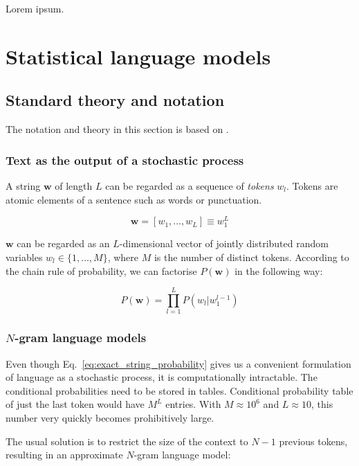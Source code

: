 \documentclass{IIBproject}
\begin{document}
Lorem ipsum.

\newpage
\section{Statistical language models}

\subsection{Standard theory and notation}

The notation and theory in this section is based on \cite{4f11:statistical_language_models, 4f11:smt_systems, coursera:nlp}.

\subsubsection{Text as the output of a stochastic process}

A string $\mathbf w$ of length $L$ can be regarded as a sequence of \emph{tokens} $w_l$. Tokens are atomic elements of a sentence such as words or punctuation.

\begin{equation}
\mathbf w = [ w_1, \dots, w_L ] \equiv w_1^L
\end{equation}

$\mathbf w$ can be regarded as an $L$-dimensional vector of jointly distributed random variables $w_l \in \{1, \dots, M\}$, where $M$ is the number of distinct tokens. According to the chain rule of probability, we can factorise $P(\mathbf w)$ in the following way:

\begin{equation}
\label{eq:exact_string_probability}
P(\mathbf w) = \prod_{l=1}^{L} P( w_l | w_1^{l-1} )
\end{equation}

\subsubsection{$N$-gram language models}

Even though Eq.~\ref{eq:exact_string_probability} gives us a convenient formulation of language as a stochastic process, it is computationally intractable. The conditional probabilities need to be stored in tables. Conditional probability table of just the last token would have $M^L$ entries. With $M \approx 10^6$ and $L \approx 10$, this number very quickly becomes prohibitively large.

The usual solution is to restrict the size of the context to $N-1$ previous tokens, resulting in an approximate $N$-gram language model:
\end{document}
